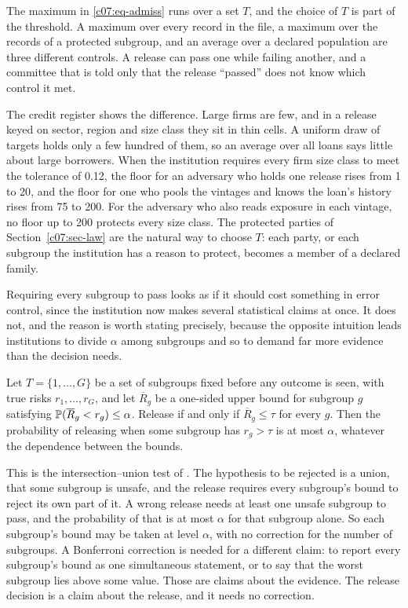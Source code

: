 The maximum in \eqref{c07:eq-admiss} runs over a set $T$, and the choice of $T$ is
part of the threshold. A maximum over every record in the file, a maximum over the
records of a protected subgroup, and an average over a declared population are
three different controls. A release can pass one while failing another, and a
committee that is told only that the release ``passed'' does not know which control
it met.

The credit register shows the difference. Large firms are few, and in a release
keyed on sector, region and size class they sit in thin cells. A uniform draw of
targets holds only a few hundred of them, so an average over all loans says little
about large borrowers. When the institution requires every firm size class to meet
the tolerance of 0.12, the floor for an adversary who holds one release rises from 1
to 20, and the floor for one who pools the vintages and knows the loan's history
rises from 75 to 200.
For the adversary who also reads exposure in each vintage, no floor up to 200
protects every size class. The protected parties of Section~\ref{c07:sec-law} are
the natural way to choose $T$: each party, or each subgroup the institution has a
reason to protect, becomes a member of a declared family.

Requiring every subgroup to pass looks as if it should cost something in error
control, since the institution now makes several statistical claims at once. It does
not, and the reason is worth stating precisely, because the opposite intuition
leads institutions to divide $\alpha$ among subgroups and so to demand far more
evidence than the decision needs.

\begin{proposition}\label{c07:prop-iut}
Let $T = \{1,\dots,G\}$ be a set of subgroups fixed before any outcome is seen, with
true risks $r_1,\dots,r_G$, and let $\overline{R}_g$ be a one-sided upper bound for
subgroup $g$ satisfying $\mathbb{P}(\overline{R}_g < r_g) \le \alpha$. Release if and only
if $\overline{R}_g \le \tau$ for every $g$. Then the probability of releasing when
some subgroup has $r_g > \tau$ is at most $\alpha$, whatever the dependence between
the bounds.
\end{proposition}

This is the intersection--union test of \citet{berger1982}. The hypothesis to be
rejected is a union, that some subgroup is unsafe, and the release requires every
subgroup's bound to reject its own part of it. A wrong release needs at least one
unsafe subgroup to pass, and the probability of that is at most $\alpha$ for that
subgroup alone. So each subgroup's bound may be taken at level $\alpha$, with no
correction for the number of subgroups. A Bonferroni correction is needed for a
different claim: to report every subgroup's bound as one simultaneous statement, or
to say that the worst subgroup lies above some value. Those are claims about the
evidence. The release decision is a claim about the release, and it needs no
correction.

